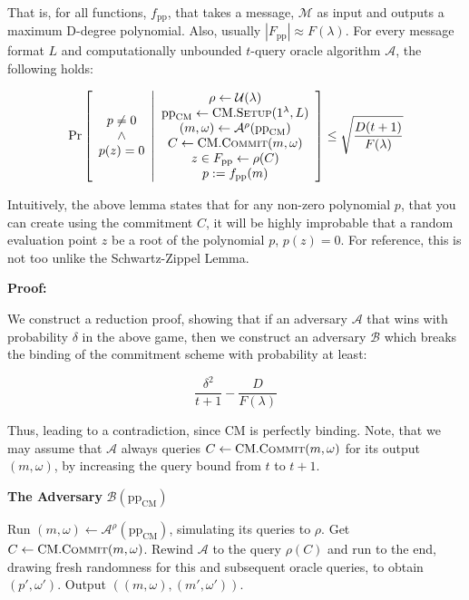 \documentclass[
]{article}
\newcommand*\Ac{\mathcal{A}}
\newcommand*\Bc{\mathcal{B}}
\newcommand*\Mc{\mathcal{M}}
\renewcommand*\d{\delta}
\renewcommand*\l{\lambda}
\renewcommand*\o{\omega}
\newcommand*{\from}{\gets}
\newcommand*{\pp}{\mathrm{pp}}
\newcommand*{\Setup}{\mathrm{\text{S{\scriptsize ETUP}}}}
\newcommand*{\Commit}{\mathrm{\text{C{\scriptsize OMMIT}}}}
\newcommand*{\CM}{\mathrm{\text{CM}}}
\newcommand*{\CMSetup}{\CM.\Setup}
\newcommand*{\CMCommit}{\CM.\Commit}
\begin{document}
That is, for all functions, \(f_\pp\), that takes a message, \(\Mc\) as
input and outputs a maximum D-degree polynomial. Also, usually
\(|F_\pp| \approx F(\l)\). For every message format \(L\) and
computationally unbounded \(t\)-query oracle algorithm \(\Ac\), the
following holds:

\[
\Pr\left[
  \begin{array}{c}
    p \neq 0 \\
    \land \\
    p(z) = 0
  \end{array}
  \middle|
  \begin{array}{c}
    \rho \from \mathcal{U}(\l) \\
    \pp_\CM \gets \CMSetup(1^\l, L) \\
    (m, \omega) \gets \Ac^\rho(\pp_\CM) \\
    C \gets \CMCommit(m, \o) \\
    z \in F_{\pp} \from \rho(C) \\
    p := f_{\pp}(m)
  \end{array}
\right] \leq \sqrt{\frac{D(t+1)}{F(\l)}}
\]

Intuitively, the above lemma states that for any non-zero polynomial
\(p\), that you can create using the commitment \(C\), it will be highly
improbable that a random evaluation point \(z\) be a root of the
polynomial \(p\), \(p(z)
= 0\). For reference, this is not too unlike the Schwartz-Zippel Lemma.

\textbf{Proof:}

We construct a reduction proof, showing that if an adversary \(\Ac\)
that wins with probability \(\d\) in the above game, then we construct
an adversary \(\Bc\) which breaks the binding of the commitment scheme
with probability at least:

\[\frac{\delta^2}{t + 1} - \frac{D}{F(\lambda)}\]

Thus, leading to a contradiction, since \(\CM\) is perfectly binding.
Note, that we may assume that \(\Ac\) always queries
\(C \from \CMCommit(m, \o)\) for its output \((m, \o)\), by increasing
the query bound from \(t\) to \(t + 1\).

\begin{algorithm}[H]
\caption*{\textbf{The Adversary} $\Bc(\pp_\CM)$}
\begin{algorithmic}[1]
  \State Run $(m, \omega) \gets \Ac^\rho(\pp_\CM)$, simulating its queries to $\rho$.
  \State Get $C \gets \CMCommit(m, \o)$.
  \State Rewind $\Ac$ to the query $\rho(C)$ and run to the end, drawing fresh randomness for this and subsequent oracle queries, to obtain $(p', \omega')$.
  \State Output $((m, \omega), (m', \omega'))$.
\end{algorithmic}
\end{algorithm}
\end{document}

